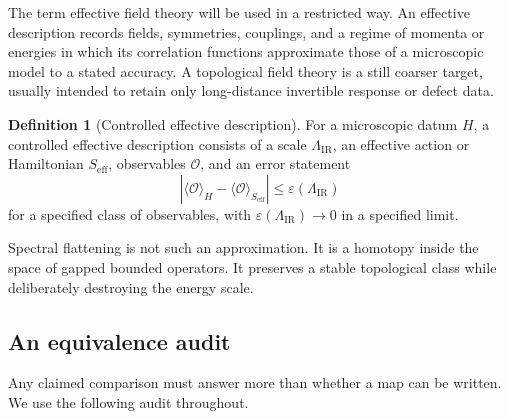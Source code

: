 \documentclass[12pt]{article}
\theoremstyle{definition}
\newtheorem{definition}[theorem]{Definition}
\theoremstyle{remark}
\begin{document}
The term effective field theory will be used in a restricted way.
An effective description records fields, symmetries, couplings, and a regime
of momenta or energies in which its correlation functions approximate those
of a microscopic model to a stated accuracy.
A topological field theory is a still coarser target, usually intended to
retain only long-distance invertible response or defect data.

\begin{definition}[Controlled effective description]
For a microscopic datum $H$, a controlled effective description consists of
a scale $\Lambda_{\mathrm{IR}}$, an effective action or Hamiltonian
$S_{\mathrm{eff}}$, observables $\mathcal O$, and an error statement
\[
\left|
\langle\mathcal O\rangle_H
-
\langle\mathcal O\rangle_{S_{\mathrm{eff}}}
\right|
\leq \varepsilon(\Lambda_{\mathrm{IR}})
\]
for a specified class of observables, with
$\varepsilon(\Lambda_{\mathrm{IR}})\to0$ in a specified limit.
\end{definition}

Spectral flattening is not such an approximation.
It is a homotopy inside the space of gapped bounded operators.
It preserves a stable topological class while deliberately destroying the
energy scale.

\subsection{An equivalence audit}

Any claimed comparison must answer more than whether a map can be written.
We use the following audit throughout.
\end{document}
